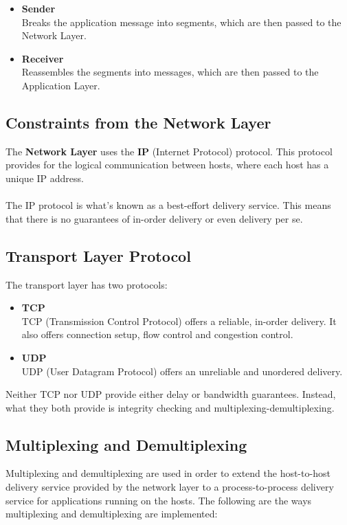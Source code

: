 \documentclass{article}
\begin{document}
\begin{itemize}
	\item \textbf{Sender}
	\vspace{.2cm} \\
	Breaks the application message into segments, which are then passed to the Network Layer.
	
	\item \textbf{Receiver}
	\vspace{.2cm} \\
	Reassembles the segments into messages, which are then passed to the Application Layer.
\end{itemize}

\subsection{Constraints from the Network Layer}
The \textbf{Network Layer} uses the \textbf{IP} (Internet Protocol) protocol. This protocol provides for the logical communication between hosts, where each host has a unique IP address. \\ \\
The IP protocol is what's known as a best-effort delivery service. This means that there is no guarantees of in-order delivery or even delivery per se.

\subsection{Transport Layer Protocol}
The transport layer has two protocols:

\begin{itemize}
	\item \textbf{TCP}
	\vspace{.2cm} \\
	TCP (Transmission Control Protocol) offers a reliable, in-order delivery. It also offers connection setup, flow control and congestion control.
	
	\item \textbf{UDP}
	\vspace{.2cm} \\
	UDP (User Datagram Protocol) offers an unreliable and unordered delivery.
\end{itemize}
Neither TCP nor UDP provide either delay or bandwidth guarantees. Instead, what they both provide is integrity checking and multiplexing-demultiplexing.

\subsection{Multiplexing and Demultiplexing}
Multiplexing and demultiplexing are used in order to extend the host-to-host delivery service provided by the network layer to a process-to-process delivery service for applications running on the hosts. The following are the ways multiplexing and demultiplexing are implemented:
\end{document}
